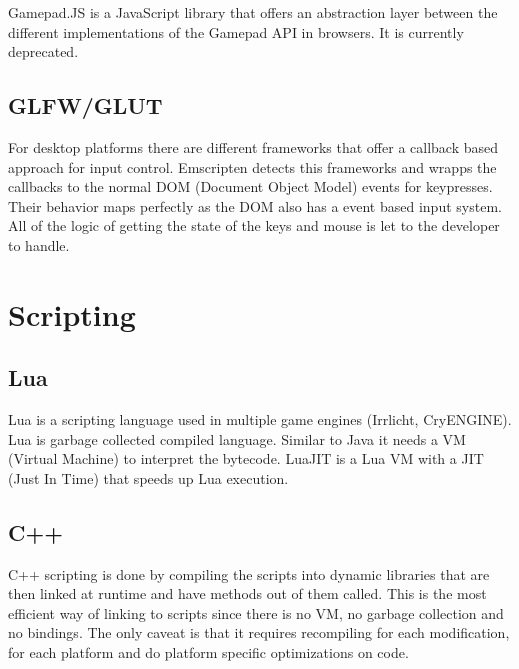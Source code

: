 Gamepad.JS is a JavaScript library that offers an abstraction layer between the different implementations of the Gamepad API in browsers. It is currently deprecated.

\subsection{GLFW/GLUT}

For desktop platforms there are different frameworks that offer a callback based approach for input control. Emscripten detects this frameworks and wrapps the callbacks to the normal DOM (Document Object Model) events for keypresses. Their behavior maps perfectly as the DOM also has a event based input system. All of the logic of getting the state of the keys and mouse is let to the developer to handle.

\section{Scripting}

\subsection{Lua}

Lua is a scripting language used in multiple game engines (Irrlicht, CryENGINE). Lua is garbage collected compiled language. Similar to Java it needs a VM (Virtual Machine) to interpret the bytecode. LuaJIT is a Lua VM with a JIT (Just In Time) that speeds up Lua execution.

\subsection{C++}

C++ scripting is done by compiling the scripts into dynamic libraries that are then linked at runtime and have methods out of them called. This is the most efficient way of linking to scripts since there is no VM, no garbage collection and no bindings. The only caveat is that it requires recompiling for each modification, for each platform and do platform specific optimizations on code.
	



